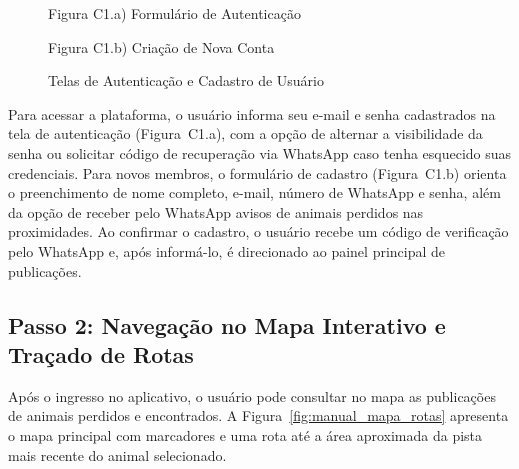 \begin{figure}[H]
    \centering
    \caption{Telas de Autenticação e Cadastro de Usuário}
    \label{fig:manual_login_cadastro}
    \vspace{0.15cm}
    \begin{minipage}[t]{0.48\textwidth}
        \centering
        \par\vspace{0.12cm}
        {\small Figura C1.a) Formulário de Autenticação}
    \end{minipage}
    \hfill
    \begin{minipage}[t]{0.48\textwidth}
        \centering
        \par\vspace{0.12cm}
        {\small Figura C1.b) Criação de Nova Conta}
    \end{minipage}
    \par\vspace{0.1cm}
\end{figure}

Para acessar a plataforma, o usuário informa seu e-mail e senha cadastrados na tela de autenticação (Figura~C1.a), com a opção de alternar a visibilidade da senha ou solicitar código de recuperação via WhatsApp caso tenha esquecido suas credenciais. Para novos membros, o formulário de cadastro (Figura~C1.b) orienta o preenchimento de nome completo, e-mail, número de WhatsApp e senha, além da opção de receber pelo WhatsApp avisos de animais perdidos nas proximidades. Ao confirmar o cadastro, o usuário recebe um código de verificação pelo WhatsApp e, após informá-lo, é direcionado ao painel principal de publicações.

\clearpage

\subsection*{Passo 2: Navegação no Mapa Interativo e Traçado de Rotas}
\noindent
Após o ingresso no aplicativo, o usuário pode consultar no mapa as publicações de animais perdidos e encontrados. A Figura~\ref{fig:manual_mapa_rotas} apresenta o mapa principal com marcadores e uma rota até a área aproximada da pista mais recente do animal selecionado.


